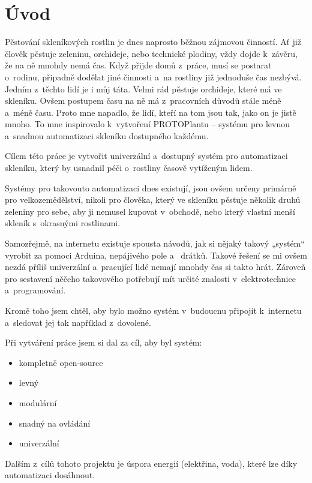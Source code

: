 \chapter*{Úvod}
Pěstování skleníkových rostlin je dnes naprosto běžnou zájmovou činností. 
Ať již člověk pěstuje zeleninu, orchideje, nebo technické plodiny, vždy dojde k~závěru, že na ně mnohdy nemá čas.
Když přijde domů z~práce, musí se postarat o~rodinu, připadně dodělat jiné činnosti a~na rostliny již jednoduše čas nezbývá.
Jedním z~těchto lidí je i můj táta.
Velmi rád pěstuje orchideje, které má ve skleníku.
Ovšem postupem času na ně má z~pracovních důvodů stále méně a~méně času.
Proto mne napadlo, že lidí, kteří na tom jsou tak, jako on je jistě mnoho.
To mne inspirovalo k~vytvoření PROTOPlantu -- systému pro levnou a~snadnou automatizaci skleníku dostupného každému. 

Cílem této práce je vytvořit univerzální a~dostupný systém pro automatizaci skleníku, který by usnadnil péči o~rostliny časově vytíženým lidem. 

Systémy pro takovouto automatizaci dnes existují, jsou ovšem určeny primárně pro velkozemědělství, nikoli pro člověka, který ve skleníku pěstuje několik druhů zeleniny pro sebe, aby ji nemusel kupovat v~obchodě, nebo který vlastní menší skleník s~okrasnými rostlinami. 

Samozřejmě, na internetu existuje spousta návodů, jak si nějaký takový „systém“ vyrobit za pomoci Arduina, nepájivého pole a~ drátků.
Takové řešení se mi ovšem nezdá příliš univerzální a~pracující lidé nemají mnohdy čas si takto hrát.
Zároveň pro sestavení něčeho takovového potřebují mít určité znalosti v~elektrotechnice a~programování.

Kromě toho jsem chtěl, aby bylo možno systém v~budoucnu připojit k~internetu a~sledovat jej tak například z~dovolené.
\newline

Při vytváření práce jsem si dal za cíl, aby byl systém:
\begin{itemize}
    \item kompletně open-source
    \item levný
    \item modulární
    \item snadný na ovládání
    \item univerzální
\end{itemize}

Dalším z~cílů tohoto projektu je úspora energií (elektřina, voda), které lze díky automatizaci dosáhnout.

\newpage
